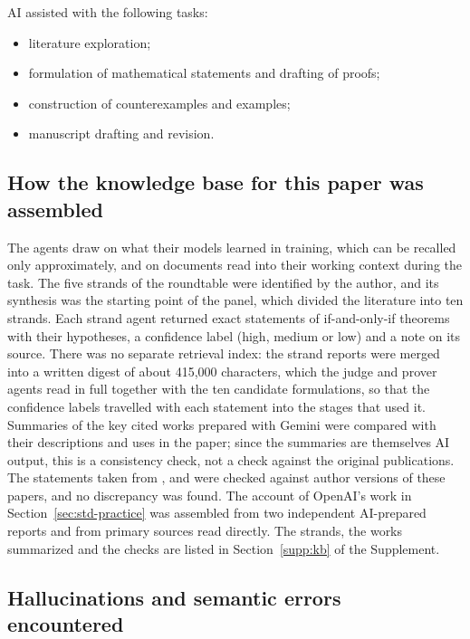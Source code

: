 

AI assisted with the following tasks:
\begin{itemize}[nosep]
\item literature exploration;
\item formulation of mathematical statements and drafting of proofs;
\item construction of counterexamples and examples;
\item manuscript drafting and revision.
\end{itemize}


\subsection{How the knowledge base for this paper was assembled}\label{sec:collab-kb}

The agents draw on what their models learned in training, which can be recalled only approximately, and on
documents read into their working context during the task. The five strands of the roundtable were identified by
the author, and its synthesis was the starting point of the panel, which divided the literature into ten strands.
Each strand agent returned exact statements of if-and-only-if theorems with their hypotheses, a confidence label
(high, medium or low) and a note on its source. There was no separate retrieval index: the strand reports were merged
into a written digest of about 415{,}000 characters, which the judge and prover agents read in full together with the
ten candidate formulations, so that the confidence labels travelled with each statement into the stages that used
it. Summaries of the key cited works prepared with Gemini were compared with their descriptions and uses in the
paper; since the summaries are themselves AI output, this is a consistency check, not a check against the original
publications. The statements taken from \citet{www2020}, \citet{www2020b} and \citet{hlw2025} were checked against
author versions of these papers, and no discrepancy was found. The account of OpenAI's work in
Section~\ref{sec:std-practice} was assembled from two independent AI-prepared reports and from primary sources read
directly. The strands, the works summarized and the checks are listed in Section~\ref{supp:kb} of the Supplement.

\subsection{Hallucinations and semantic errors encountered}


